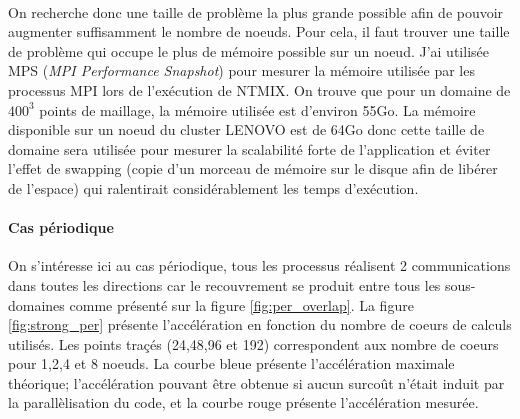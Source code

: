 \paragraph{}On recherche donc une taille de problème la plus grande possible afin de pouvoir augmenter suffisamment le nombre de noeuds. Pour cela, il faut trouver une taille de problème qui occupe le plus de mémoire possible sur un noeud. J'ai utilisée MPS (\textit{MPI Performance Snapshot}) pour mesurer la mémoire utilisée par les processus MPI lors de l'exécution de NTMIX. On trouve que pour un domaine de $400^3$ points de maillage, la mémoire utilisée est d'environ 55Go. La mémoire disponible sur un noeud du cluster LENOVO est de 64Go donc cette taille de domaine sera utilisée pour mesurer la scalabilité forte de l'application et éviter l'effet de swapping (copie d'un morceau de mémoire sur le disque afin de libérer de l'espace) qui ralentirait considérablement les temps d'exécution.



\paragraph{Cas périodique}
On s'intéresse ici au cas périodique, tous les processus réalisent 2 communications dans toutes les directions car le recouvrement se produit entre tous les sous-domaines comme présenté sur la figure \ref{fig:per_overlap}. La figure \ref{fig:strong_per} présente l'accélération en fonction du nombre de coeurs de calculs utilisés. Les points traçés (24,48,96 et 192) correspondent aux nombre de coeurs pour 1,2,4 et 8 noeuds. La courbe bleue présente l'accélération maximale théorique; l'accélération pouvant être obtenue si aucun surcoût n'était induit par la parallèlisation du code, et la courbe rouge présente l'accélération mesurée.


